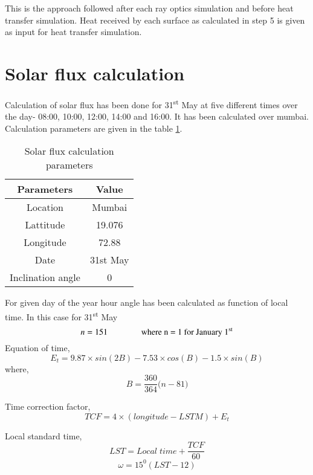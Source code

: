 This is the approach followed after each ray optics simulation and before heat transfer simulation. Heat received by each surface as calculated in step 5 is given as input for heat transfer simulation.

\section{Solar flux calculation}
Calculation of solar flux has been done for 31\textsuperscript{st} May at five different times over the day- 08:00, 10:00, 12:00, 14:00 and 16:00. It has been calculated over mumbai. Calculation parameters are given in the table \ref{tab:solarFluxCalcParams}.


\begin{table}[H]
\centering
\caption{Solar flux calculation parameters}
\label{tab:solarFluxCalcParams}
\begin{tabular}{@{}|c|c|@{}}
\toprule
\textbf{Parameters} & \textbf{Value} \\ \midrule
Location            & Mumbai         \\ \midrule
Lattitude           & 19.076         \\ \midrule
Longitude           & 72.88          \\ \midrule
Date                & 31st May       \\ \midrule
Inclination angle   & 0              \\ \bottomrule
\end{tabular}
\end{table}

For given day of the year hour angle has been calculated as function of local time. In this case for 31\textsuperscript{st} May\\ 
\[
n = 151 \qquad \qquad \text{where n = 1 for January 1\textsuperscript{st}} 
\]
Equation of time,
\begin{equation}
E_{t} =  9.87\times sin(2B)-7.53\times cos(B)-1.5\times sin(B)
\end{equation}
where, 
\[
B = \frac{360}{364}\big(n-81\big)
\]

Time correction factor,
\begin{equation}
TCF = 4\times (longitude - LSTM) + E_{t}
\end{equation}

Local standard time,
\begin{equation}
LST = Local\; time + \frac{TCF}{60}
\end{equation}
\begin{equation}\label{eq:hourAngle}
\omega = 15^0 (LST-12)
\end{equation}

